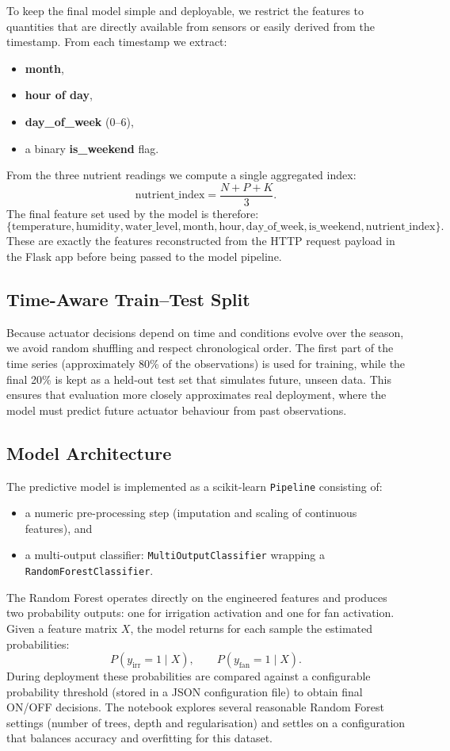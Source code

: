 \documentclass[sn-mathphys,Numbered]{sn-jnl}
\begin{document}
To keep the final model simple and deployable, we restrict the features to quantities that are directly available from sensors or easily derived from the timestamp.  
From each timestamp we extract:
\begin{itemize}
    \item \textbf{month},
    \item \textbf{hour of day},
    \item \textbf{day\_of\_week} (0--6),
    \item a binary \textbf{is\_weekend} flag.
\end{itemize}
From the three nutrient readings we compute a single aggregated index:
\[
\text{nutrient\_index} = \frac{N + P + K}{3}.
\]
The final feature set used by the model is therefore:
\[
\{\text{temperature}, \text{humidity}, \text{water\_level}, \text{month}, \text{hour}, \text{day\_of\_week}, \text{is\_weekend}, \text{nutrient\_index}\}.
\]
These are exactly the features reconstructed from the HTTP request payload in the Flask app before being passed to the model pipeline.

\subsection{Time-Aware Train--Test Split}

Because actuator decisions depend on time and conditions evolve over the season, we avoid random shuffling and respect chronological order.  
The first part of the time series (approximately 80\% of the observations) is used for training, while the final 20\% is kept as a held-out test set that simulates future, unseen data.  
This ensures that evaluation more closely approximates real deployment, where the model must predict future actuator behaviour from past observations.

\subsection{Model Architecture}

The predictive model is implemented as a scikit-learn \texttt{Pipeline} consisting of:
\begin{itemize}
    \item a numeric pre-processing step (imputation and scaling of continuous features), and
    \item a multi-output classifier: \texttt{MultiOutputClassifier} wrapping a \texttt{RandomForestClassifier}.
\end{itemize}
The Random Forest operates directly on the engineered features and produces two probability outputs: one for irrigation activation and one for fan activation.  
Given a feature matrix $X$, the model returns for each sample the estimated probabilities:
\[
P(y_{\text{irr}} = 1 \mid X), \qquad P(y_{\text{fan}} = 1 \mid X).
\]
During deployment these probabilities are compared against a configurable probability threshold (stored in a JSON configuration file) to obtain final ON/OFF decisions.  
The notebook explores several reasonable Random Forest settings (number of trees, depth and regularisation) and settles on a configuration that balances accuracy and overfitting for this dataset.
\end{document}
